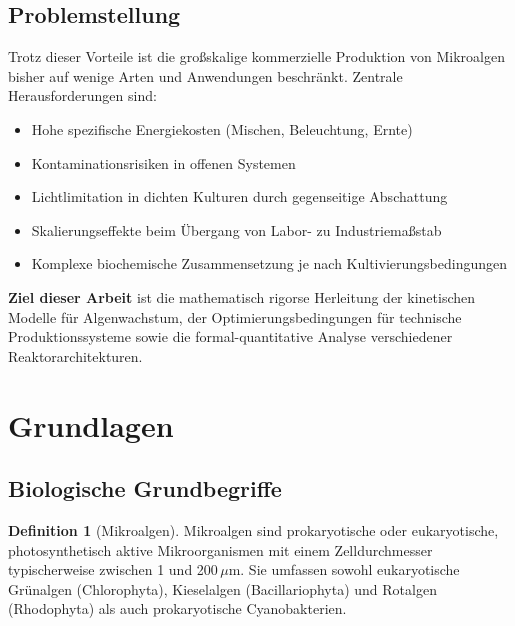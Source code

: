 ﻿\documentclass[a4paper,12pt]{article}
\theoremstyle{definition}
\newtheorem{definition}{Definition}
\begin{document}
\subsection{Problemstellung}

Trotz dieser Vorteile ist die großskalige kommerzielle Produktion von Mikroalgen bisher
auf wenige Arten und Anwendungen beschränkt. Zentrale Herausforderungen sind:

\begin{itemize}
	\item Hohe spezifische Energiekosten (Mischen, Beleuchtung, Ernte)
	\item Kontaminationsrisiken in offenen Systemen
	\item Lichtlimitation in dichten Kulturen durch gegenseitige Abschattung
	\item Skalierungseffekte beim Übergang von Labor- zu Industriemaßstab
	\item Komplexe biochemische Zusammensetzung je nach Kultivierungsbedingungen
\end{itemize}

\textbf{Ziel dieser Arbeit} ist die mathematisch rigorse Herleitung der kinetischen
Modelle für Algenwachstum, der Optimierungsbedingungen für technische Produktionssysteme
sowie die formal-quantitative Analyse verschiedener Reaktorarchitekturen.

\section{Grundlagen}

\subsection{Biologische Grundbegriffe}

\begin{definition}[Mikroalgen]
	Mikroalgen sind prokaryotische oder eukaryotische, photosynthetisch aktive
	Mikroorganismen mit einem Zelldurchmesser typischerweise zwischen 1 und 200\,$\mu$m.
	Sie umfassen sowohl eukaryotische Grünalgen (Chlorophyta), Kieselalgen (Bacillariophyta)
	und Rotalgen (Rhodophyta) als auch prokaryotische Cyanobakterien.
\end{definition}
\end{document}
